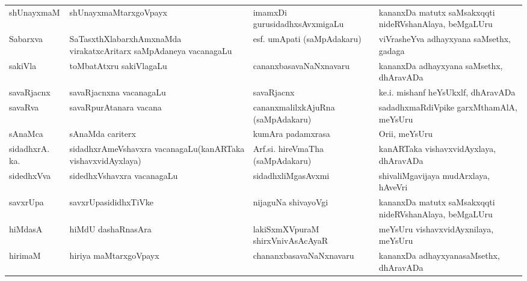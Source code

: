 {\begin{longtable}{lp{4.2cm}p{4.2cm}<{\raggedright}p{4.2cm}<{\raggedright}@{}}
shUnayxmaM & shUnayxmaMtarxgoVpayx & imamxDi gurusidadhxsAvxmigaLu & kananxDa matutx saMsakxqqti nideRVshanAlaya, beMgaLUru\\
Sabarxva & SaTasxthXlabarxhAmxnaMda virakatxcAritarx saMpAdaneya vacanagaLu & esf. umApati (saMpAdakaru) & viVrasheYva adhayxyana saMsethx, gadaga\\
sakiVla & toMbatAtxru sakiVlagaLu & cananxbasavaNaNxnavaru & kananxDa adhayxyana saMsethx, dhAravADa\\
savaRjacnx & savaRjacnxna vacanagaLu & savaRjacnx & ke.i. mishanf heYsUkxlf, dhAravADa\\
savaRva & savaRpurAtanara vacana & cananxmalilxkAjuRna (saMpAdakaru) & sadadhxmaRdiVpike garxMthamAlA, meYsUru\\
sAnaMca & sAnaMda cariterx & kumAra padamxrasa & Ori{i}, meYsUru\\
sidadhxrA. ka. & sidadhxrAmeVshavxra vacanagaLu\newline (kanARTaka vishavxvidAyxlaya) & Arf.si. hireVmaTha (saMpAdakaru) & kanARTaka vishavxvidAyxlaya, dhAravADa\\
sidedhxVva & sidedhxVshavxra vacanagaLu & sidadhxliMgasAvxmi & shivaliMgavijaya mudArxlaya, hAveVri\\
savxrUpa & savxrUpasididhxTiVke & nijaguNa shivayoVgi & kananxDa matutx saMsakxqqti nideRVshanAlaya, beMgaLUru\\
hiMdasA & hiMdU dashaRnasAra & lakiSxmXVpuraM shirxVnivAsAcAyaR & meYsUru vishavxvidAyxnilaya, meYsUru\\
hirimaM & hiriya maMtarxgoVpayx & chananxbasavaNaNxnavaru & kananxDa adhayxyanasaMsethx, dhAravADa
\end{longtable}}
